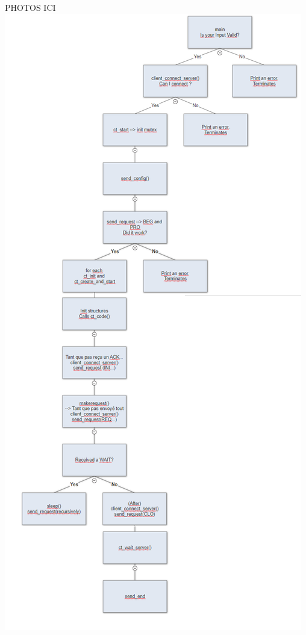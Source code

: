 \documentclass[11pt]{article}
\begin{document}
PHOTOS ICI
\includegraphics[width=\textwidth,height=\textheight,keepaspectratio]{CLIENT}
\end{document}
